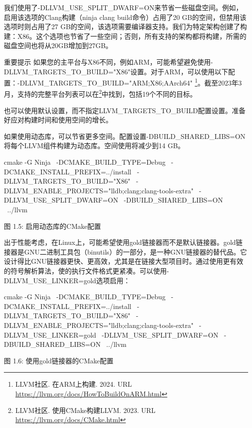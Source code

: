 我们使用了-DLLVM\_USE\_SPLIT\_DWARF=ON来节省一些磁盘空间。例如，启用该选项的Clang构建（ninja clang build命令）占用了20 GB的空间，但禁用该选项时则占用了27 GB的空间，该选项需要编译器支持。我们为特定架构创建了构建：X86。这个选项也节省了一些空间；否则，所有支持的架构都将构建，所需的磁盘空间也将从20GB增加到27GB。

\begin{myNotic}{重要提示}
如果您的主平台与X86不同，例如ARM，可能希望避免使用-DLLVM\_TARGETS\_TO\_BUILD="X86"设置。对于ARM，可以使用以下配置：-DLLVM\_TARGETS\_TO\_BUILD="ARM;X86;AArch64" \footnote{LLVM社区. 在ARM上构建. 2024. URL \url{https://llvm.org/docs/HowToBuildOnARM.html}}。截至2023年3月，支持的完整平台列表可以在\footnote{LLVM社区. 使用CMake构建LLVM. 2023. URL \url{https://llvm.org/docs/CMake.html}}中找到，包括19个不同的目标。
\end{myNotic}

也可以使用默认设置，而不指定LLVM\_TARGETS\_TO\_BUILD配置设置。准备好应对构建时间和使用空间的增长。

如果使用动态库，可以节省更多空间。配置设置-DBUILD\_SHARED\_LIBS=ON将每个LLVM组件构建为动态库。空间使用将减少到14 GB。

\begin{shell}
cmake -G Ninja \
  -DCMAKE_BUILD_TYPE=Debug \
  -DCMAKE_INSTALL_PREFIX=../install \
  -DLLVM_TARGETS_TO_BUILD="X86" \
  -DLLVM_ENABLE_PROJECTS="lldb;clang;clang-tools-extra" \
  -DLLVM_USE_SPLIT_DWARF=ON \
  -DBUILD_SHARED_LIBS=ON \
  ../llvm
\end{shell}

\begin{center}
图 1.5: 启用动态库的CMake配置
\end{center}

出于性能考虑，在Linux上，可能希望使用gold链接器而不是默认链接器。gold链接器是GNU二进制工具包（binutils）的一部分，是一种GNU链接器的替代品。它设计得比GNU链接器更快、更高效，尤其是在链接大型项目时。通过使用更有效的符号解析算法，使的执行文件格式更紧凑。可以使用-DLLVM\_USE\_LINKER=gold选项启用：

\begin{shell}
cmake -G Ninja \
  -DCMAKE_BUILD_TYPE=Debug \
  -DCMAKE_INSTALL_PREFIX=../install \
  -DLLVM_TARGETS_TO_BUILD="X86" \
  -DLLVM_ENABLE_PROJECTS="lldb;clang;clang-tools-extra" \
  -DLLVM_USE_LINKER=gold \
  -DLLVM_USE_SPLIT_DWARF=ON \
  -DBUILD_SHARED_LIBS=ON \
  ../llvm
\end{shell}

\begin{center}
图 1.6: 使用gold链接器的CMake配置
\end{center}

